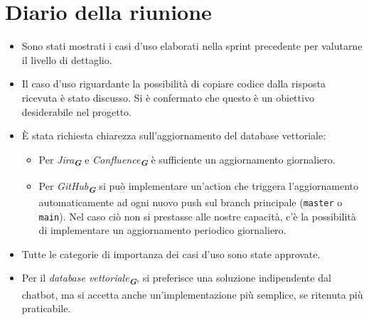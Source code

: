 
\section{Diario della riunione}

\begin{itemize}
    \item Sono stati mostrati i casi d'uso elaborati nella sprint precedente per valutarne il livello di dettaglio.
    \item Il caso d'uso riguardante la possibilità di copiare codice dalla risposta ricevuta è stato discusso. Si è confermato che questo è un obiettivo desiderabile nel progetto. 
    \item È stata richiesta chiarezza sull'aggiornamento del database vettoriale:
    \begin{itemize}
        \item Per \emph{Jira}\textsubscript{\textbf{\textit{G}}} e \emph{Confluence}\textsubscript{\textbf{\textit{G}}} è sufficiente un aggiornamento giornaliero.
        \item Per \emph{GitHub}\textsubscript{\textbf{\textit{G}}} si può implementare un'action che triggera l'aggiornamento automaticamente ad ogni nuovo push sul branch principale (\texttt{master} o \texttt{main}). Nel caso ciò non si prestasse alle nostre capacità, c'è la possibilità di implementare un aggiornamento periodico giornaliero.
    \end{itemize}
    \item Tutte le categorie di importanza dei casi d'uso sono state approvate.
    \item Per il \emph{database vettoriale}\textsubscript{\textbf{\textit{G}}}, si preferisce una soluzione indipendente dal chatbot, ma si accetta anche un'implementazione più semplice, se ritenuta più praticabile.
\end{itemize}